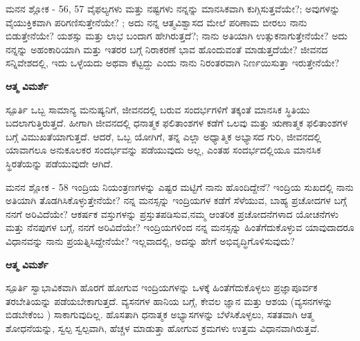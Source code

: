 \newpage
\begin{mananam}{\mananamfont ಮನನ ಶ್ಲೋಕ - \textenglish{56, 57}}
\footnotesize \mananamtext ವೈಫಲ್ಯಗಳು ಮತ್ತು ನಷ್ಟಗಳು ನನ್ನನ್ನು ಮಾನಸಿಕವಾಗಿ  ಕುಗ್ಗಿಸುತ್ತವೆಯೇ?; ಅವುಗಳನ್ನು ವೈಯುಕ್ತಿಕವಾಗಿ ಪರಿಗಣಿಸುತ್ತೇನೆಯೇ? ; ಅದು ನನ್ನ ಆತ್ಮವಿಶ್ವಾಸದ ಮೇಲೆ ಪರಿಣಾಮ ಬೀರಲು ನಾನು ಬಿಡುತ್ತೇನೆಯೇ? ಯಶಸ್ಸು ಮತ್ತು ಲಾಭ ಬಂದಾಗ ಹೇಗಿರುತ್ತದೆ?; ನಾನು ಅತಿಯಾಗಿ  ಉತ್ಸುಕನಾಗುತ್ತೇನೆಯೇ? ಅದು ನನ್ನನ್ನು ಅಹಂಕಾರಿಯಾಗಿ ಮತ್ತು ಇತರರ ಬಗ್ಗೆ ನಿರಾಕರಣೆ ಭಾವ ಹೊಂದುವಂತೆ ಮಾಡುತ್ತದೆಯೇ? ಜೀವನದ ಸನ್ನಿವೇಶದಲ್ಲಿ, ಇದು ಒಳ್ಳೆಯದು ಅಥವಾ ಕೆಟ್ಟದ್ದು ಎಂದು ನಾನು ನಿರಂತರವಾಗಿ ನಿರ್ಣಯಿಸುತ್ತಾ ಇರುತ್ತೇನೆಯೇ?
\end{mananam}
\WritingHand\enspace\textbf{ಆತ್ಮ ವಿಮರ್ಶೆ}
\begin{inspiration}{\mananamfont ಸ್ಪೂರ್ತಿ}
\footnotesize \mananamtext ಒಬ್ಬ ಸಾಮಾನ್ಯ ಮನುಷ್ಯನಿಗೆ, ಜೀವನದಲ್ಲಿ ಬರುವ ಸಂದರ್ಭಗಳಿಗೆ ತಕ್ಕಂತೆ ಮಾನಸಿಕ ಸ್ಥಿತಿಯು ಬದಲಾಗುತ್ತಿರುತ್ತದೆ. ಹೀಗಾಗಿ ಜೀವನದಲ್ಲಿ ಧನಾತ್ಮಕ ಫಲಿತಾಂಶಗಳ ಕಡೆಗೆ ಒಲವು ಮತ್ತು ಋಣಾತ್ಮಕ ಫಲಿತಾಂಶಗಳ ಬಗ್ಗೆ ವಿಮುಖತೆಯಾಗುತ್ತದೆ. ಆದರೆ,  ಒಬ್ಬ ಯೋಗಿಗೆ, ತನ್ನ ಎಲ್ಲಾ ಅಧ್ಯಾತ್ಮಿಕ ಅಭ್ಯಾಸದ ಗುರಿ, ಜೀವನದಲ್ಲಿ ಯಾವಾಗಲೂ ಅನುಕೂಲಕರ ಸಂದರ್ಭವನ್ನು ಪಡೆಯುವುದು ಅಲ್ಲ, ಎಂತಹ ಸಂದರ್ಭದಲ್ಲಿಯೂ ಮಾನಸಿಕ ಸ್ಥಿರತೆಯನ್ನು ಪಡೆಯುವುದೇ ಆಗಿದೆ.
\end{inspiration}
\newpage

\begin{mananam}{\mananamfont ಮನನ ಶ್ಲೋಕ - \textenglish{58}}
\footnotesize \mananamtext ಇಂದ್ರಿಯ ನಿಯಂತ್ರಣಗಳನ್ನು ಎಷ್ಟರ ಮಟ್ಟಿಗೆ ನಾನು ಹೊಂದಿದ್ದೇನೆ? ಇಂದ್ರಿಯ ಸುಖದಲ್ಲಿ ನಾನು ಅತಿಯಾಗಿ ತೊಡಗಿಸಿಕೊಳ್ಳುತ್ತೇನೆಯೇ? ನನ್ನ ಮನಸ್ಸನ್ನು ಇಂದ್ರಿಯಗಳ ಕಡೆಗೆ ಸೆಳೆಯುವ, ಬಾಹ್ಯ ಪ್ರಚೋದಗಳ ಬಗ್ಗೆ ನನಗೆ ಅರಿವಿದೆಯೇ? ಆಕರ್ಷಕ ವಸ್ತುಗಳನ್ನು ಪ್ರಸ್ತುತಪಡಿಸುವ,ನಮ್ಮ ಆಂತರಿಕ ಪ್ರಚೋದನೆಗಳಾದ ಯೋಚನೆಗಳು ಮತ್ತು ನೆನಪುಗಳ ಬಗ್ಗೆ, ನನಗೆ ಅರಿವಿದೆಯೇ? ಇಂದ್ರಿಯಗಳಿಂದ ನನ್ನ ಮನಸ್ಸನ್ನು ಹಿಂತೆಗೆದುಕೊಳ್ಳುವ ಯಾವುದಾದರೂ ವಿಧಾನವನ್ನು ನಾನು ಪ್ರಯತ್ನಿಸಿದ್ದೇನೆಯೇ? ಇಲ್ಲವಾದಲ್ಲಿ, ಅದನ್ನು ಹೇಗೆ ಅಭಿವೃದ್ಧಿಗೊಳಿಸುವುದು?
\end{mananam}
\WritingHand\enspace\textbf{ಆತ್ಮ ವಿಮರ್ಶೆ}
\begin{inspiration}{\mananamfont ಸ್ಪೂರ್ತಿ}
\footnotesize \mananamtext ಸ್ವಾಭಾವಿಕವಾಗಿ ಹೊರಗೆ ಹೋಗುವ ಇಂದ್ರಿಯಗಳನ್ನು ಒಳಕ್ಕೆ ಹಿಂತೆಗೆದುಕೊಳ್ಳಲು ಪ್ರಜ್ಞಾಪೂರ್ವಕ ತರಬೇತಿಯನ್ನು ಪಡೆಯಬೇಕಾಗುತ್ತದೆ. ವ್ಯಸನಗಳ ಹಾನಿಯ ಬಗ್ಗೆ, ಕೇವಲ ಜ್ಞಾನ ಮತ್ತು ಆಶಯ (ವ್ಯಸನಗಳನ್ನು ಬಿಡಬೇಕೆಂಬ ) ಸಾಕಾಗುವುದಿಲ್ಲ. ಹೊಸತಾಗಿ ಧನಾತ್ಮಕ ಅಭ್ಯಾಸಗಳನ್ನು ಬೆಳೆಸಿಕೊಳ್ಳಲು, ಸತತವಾಗಿ ಆತ್ಮ ಶೋಧನೆಯನ್ನು, ಸ್ವಲ್ಪ ಸ್ವಲ್ಪವಾಗಿ, ಹೆಚ್ಚಳ ಮಾಡುತ್ತಾ ಹೋಗುವ ಕ್ರಮಗಳು ಉತ್ತಮ ವಿಧಾನವಾಗಿರುತ್ತವೆ.
\end{inspiration}
\newpage

